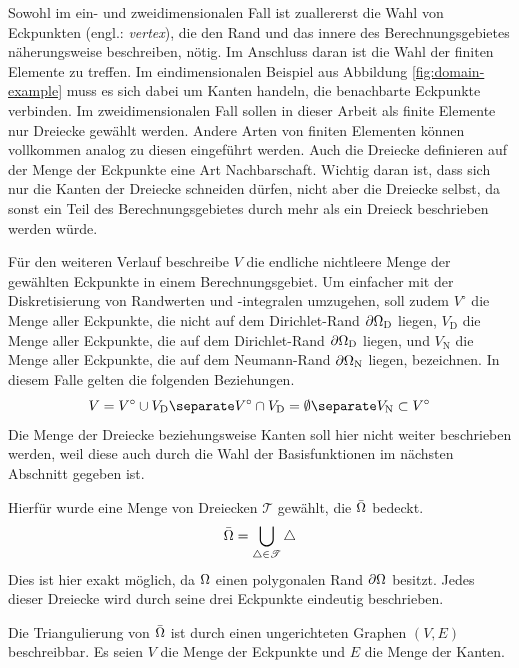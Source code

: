 \documentclass[crop=false]{standalone}
\begin{document}
        Sowohl im ein- und zweidimensionalen Fall ist zuallererst die Wahl von Eckpunkten (engl.: \textit{vertex}), die den Rand und das innere des Berechnungsgebietes näherungsweise beschreiben, nötig.
        Im Anschluss daran ist die Wahl der finiten Elemente zu treffen.
        Im eindimensionalen Beispiel aus Abbildung \ref{fig:domain-example} muss es sich dabei um Kanten handeln, die benachbarte Eckpunkte verbinden.
        Im zweidimensionalen Fall sollen in dieser Arbeit als finite Elemente nur Dreiecke gewählt werden.
        Andere Arten von finiten Elementen können vollkommen analog zu diesen eingeführt werden.
        Auch die Dreiecke definieren auf der Menge der Eckpunkte eine Art Nachbarschaft.
        Wichtig daran ist, dass sich nur die Kanten der Dreiecke schneiden dürfen, nicht aber die Dreiecke selbst, da sonst ein Teil des Berechnungsgebietes durch mehr als ein Dreieck beschrieben werden würde.

        Für den weiteren Verlauf beschreibe $V$ die endliche nichtleere Menge der gewählten Eckpunkte in einem Berechnungsgebiet.
        Um einfacher mit der Diskretisierung von Randwerten und -integralen umzugehen, soll zudem $V^\circ$ die Menge aller Eckpunkte, die nicht auf dem Dirichlet-Rand $\partial\Omega_\mathrm{D}$ liegen, $V_\mathrm{D}$ die Menge aller Eckpunkte, die auf dem Dirichlet-Rand $\partial\Omega_\mathrm{D}$ liegen, und $V_\mathrm{N}$ die Menge aller Eckpunkte, die auf dem Neumann-Rand $\partial\Omega_\mathrm{N}$ liegen, bezeichnen.
        In diesem Falle gelten die folgenden Beziehungen.
        \[
          V = V^\circ \cup V_\mathrm{D}
          \separate
          V^\circ \cap V_\mathrm{D} = \emptyset
          \separate
          V_\mathrm{N} \subset V^\circ
        \]
        Die Menge der Dreiecke beziehungsweise Kanten soll hier nicht weiter beschrieben werden, weil diese auch durch die Wahl der Basisfunktionen im nächsten Abschnitt gegeben ist.

        Hierfür wurde eine Menge von Dreiecken $\mathscr{T}$ gewählt, die $\bar{\Omega}$ bedeckt.
        \[
          \bar{\Omega} = \bigcup_{\triangle\in\mathscr{T}} \triangle
        \]
        Dies ist hier exakt möglich, da $\Omega$ einen polygonalen Rand $\partial\Omega$ besitzt.
        Jedes dieser Dreiecke wird durch seine drei Eckpunkte eindeutig beschrieben.

        Die Triangulierung von $\bar{\Omega}$ ist durch einen ungerichteten Graphen $(V,E)$ beschreibbar.
        Es seien $V$ die Menge der Eckpunkte und $E$ die Menge der Kanten.
\end{document}
